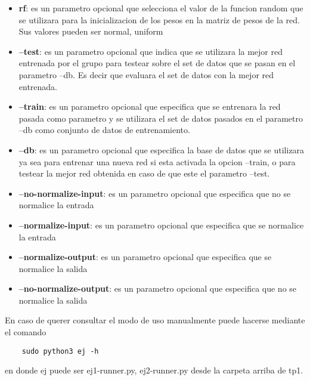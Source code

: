 \begin{itemize}
  \item \textbf{rf}: es un parametro opcional que selecciona el valor de la funcion random que se utilizara para la inicializacion de los pesos en la matriz de pesos de la red.
            Sus valores pueden ser {normal, uniform}
  \item \textbf{--test}: es un parametro opcional que indica que se utilizara la mejor red entrenada por el grupo para testear sobre el set de datos que se pasan en el parametro
                        --db. Es decir que evaluara el set de datos con la mejor red entrenada.
  \item \textbf{--train}: es un parametro opcional que especifica que se entrenara la red pasada como parametro y se utilizara el set de datos pasados en el parametro --db
                        como conjunto de datos de entrenamiento.
  \item \textbf{--db}: es un parametro opcional que especifica la base de datos que se utilizara ya sea para entrenar una nueva red si esta activada la opcion --train, o
                        para testear la mejor red obtenida en caso de que este el parametro --test.
  \item \textbf{--no-normalize-input}: es un parametro opcional que especifica que no se normalice la entrada
  \item \textbf{--normalize-input}: es un parametro opcional que especifica que se normalice la entrada
  \item \textbf{--normalize-output}: es un parametro opcional que especifica que se normalice la salida
  \item \textbf{--no-normalize-output}: es un parametro opcional que especifica que no se normalice la salida
\end{itemize}

En caso de querer consultar el modo de uso manualmente puede hacerse mediante el comando
\begin{verbatim}
    sudo python3 ej -h
\end{verbatim}
en donde ej puede ser {ej1-runner.py, ej2-runner.py} desde la carpeta arriba de tp1.
%

\newpage
